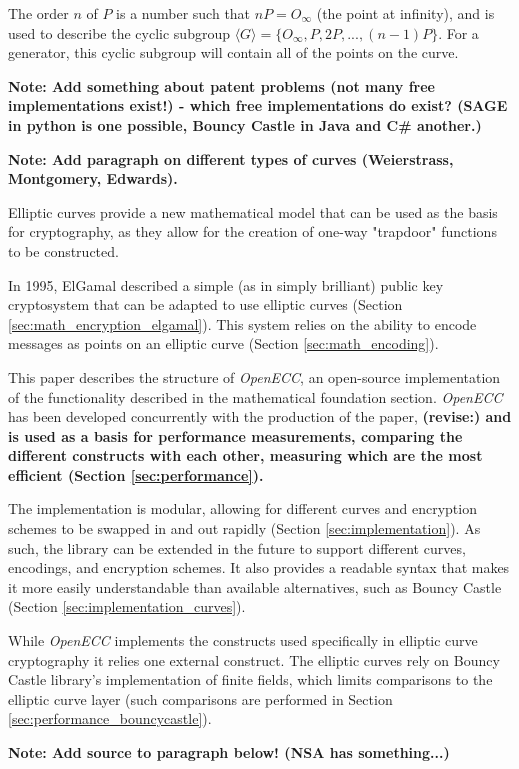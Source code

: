 The order \(n\) of \(P\) is a number such that \(nP = O_{\infty}\) (the point at infinity), and is used to describe
the cyclic subgroup \(\langle G \rangle = \{ O_\infty, P, 2P, ..., (n-1)P \} \). For a generator, this cyclic subgroup
will contain all of the points on the curve.

\textbf{Note: Add something about patent problems (not many free implementations exist!) - which free
implementations do exist? (SAGE in python is one possible, Bouncy Castle in Java and C\# another.)}

\textbf{Note: Add paragraph on different types of curves (Weierstrass, Montgomery, Edwards).}

Elliptic curves provide a new mathematical model that can be used as the basis for cryptography,
as they allow for the creation of one-way "trapdoor" functions to be constructed.

In 1995, ElGamal described a simple (as in simply brilliant) public key cryptosystem that can be adapted
to use elliptic curves (Section \ref{sec:math_encryption_elgamal}). This system relies on the ability to
encode messages as points on an elliptic curve (Section \ref{sec:math_encoding}).

This paper describes the structure of \emph{OpenECC}, an open-source implementation of the functionality
described in the mathematical foundation section. \emph{OpenECC} has been developed concurrently with the
production of the paper, \textbf{(revise:) and is used as a basis for performance measurements, comparing the different constructs
with each other, measuring which are the most efficient (Section \ref{sec:performance}).}

The implementation is modular, allowing for different curves and encryption schemes to be swapped in and out
rapidly (Section \ref{sec:implementation}). As such, the library can be extended in the future to support different
curves, encodings, and encryption schemes. It also provides a readable syntax that makes it more easily
understandable than available alternatives, such as Bouncy Castle (Section \ref{sec:implementation_curves}).

While \emph{OpenECC} implements the constructs used specifically in elliptic curve cryptography it relies one external construct.
The elliptic curves rely on Bouncy Castle library's implementation of finite fields, which limits comparisons to the elliptic curve
layer (such comparisons are performed in Section \ref{sec:performance_bouncycastle}).

\textbf{Note: Add source to paragraph below! (NSA has something...)}

